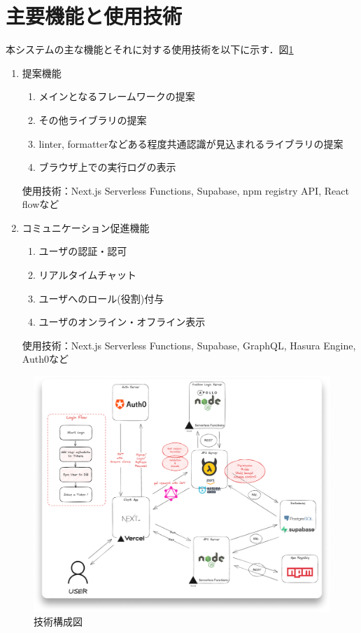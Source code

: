 \documentclass[main]{subfiles}
\begin{document}
\section{主要機能と使用技術}
本システムの主な機能とそれに対する使用技術を以下に示す．図\ref{fig:techstack}

\begin{enumerate}
\item 提案機能
\begin{enumerate}
\item メインとなるフレームワークの提案
\item その他ライブラリの提案
\item linter, formatterなどある程度共通認識が見込まれるライブラリの提案
\item ブラウザ上での実行ログの表示
\end{enumerate}
使用技術：Next.js Serverless Functions, Supabase, npm registry API, React flowなど

\item コミュニケーション促進機能
\begin{enumerate}
\item ユーザの認証・認可
\item リアルタイムチャット
\item ユーザへのロール(役割)付与
\item ユーザのオンライン・オフライン表示
\end{enumerate}
使用技術：Next.js Serverless Functions, Supabase, GraphQL, Hasura Engine, Auth0など
\end{enumerate}

\begin{figure}[h]
    \centering
    \includegraphics[keepaspectratio,width=0.8\linewidth]{../figures/techstack.png}
    \caption{技術構成図}
    \label{fig:techstack}
\end{figure}
\end{document}
